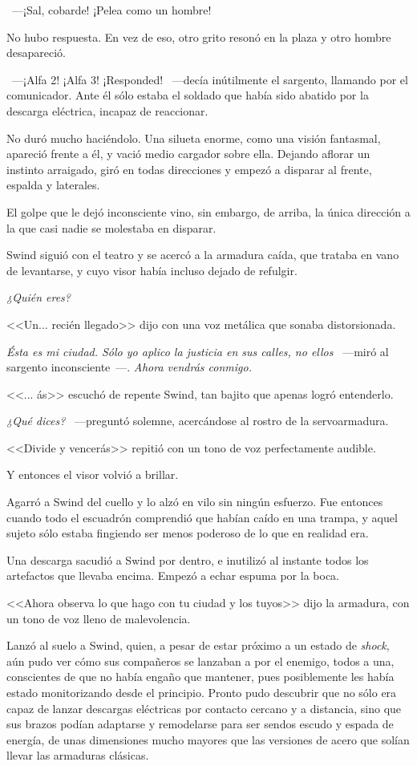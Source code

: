 ~---¡Sal, cobarde! ¡Pelea como un hombre!

No hubo respuesta. En vez de eso, otro grito resonó en la plaza y otro hombre desapareció.

~---¡Alfa 2! ¡Alfa 3! ¡Responded! ~---decía inútilmente el sargento, llamando por el comunicador. Ante él sólo estaba el soldado que había sido abatido por la descarga eléctrica, incapaz de reaccionar.

No duró mucho haciéndolo. Una silueta enorme, como una visión fantasmal, apareció frente a él, y vació medio cargador sobre ella. Dejando aflorar un instinto arraigado, giró en todas direcciones y empezó a disparar al frente, espalda y laterales.

El golpe que le dejó inconsciente vino, sin embargo, de arriba, la única dirección a la que casi nadie se molestaba en disparar.

Swind siguió con el teatro y se acercó a la armadura caída, que trataba en vano de levantarse, y cuyo visor había incluso dejado de refulgir.

\emph{¿Quién eres?}

<<Un... recién llegado>> dijo con una voz metálica que sonaba distorsionada.

\emph{Ésta es mi ciudad. Sólo yo aplico la justicia en sus calles, no ellos} ~---miró al sargento inconsciente~---. \emph{Ahora vendrás conmigo.}

<<... ás>> escuchó de repente Swind, tan bajito que apenas logró entenderlo.

\emph{¿Qué dices?} ~---preguntó solemne, acercándose al rostro de la servoarmadura.

<<Divide y vencerás>> repitió con un tono de voz perfectamente audible.

Y entonces el visor volvió a brillar.

Agarró a Swind del cuello y lo alzó en vilo sin ningún esfuerzo. Fue entonces cuando todo el escuadrón comprendió que habían caído en una trampa, y aquel sujeto sólo estaba fingiendo ser menos poderoso de lo que en realidad era.

Una descarga sacudió a Swind por dentro, e inutilizó al instante todos los artefactos que llevaba encima. Empezó a echar espuma por la boca.

<<Ahora observa lo que hago con tu ciudad y los tuyos>> dijo la armadura, con un tono de voz lleno de malevolencia.

Lanzó al suelo a Swind, quien, a pesar de estar próximo a un estado de \emph{shock}, aún pudo ver cómo sus compañeros se lanzaban a por el enemigo, todos a una, conscientes de que no había engaño que mantener, pues posiblemente les había estado monitorizando desde el principio. Pronto pudo descubrir que no sólo era capaz de lanzar descargas eléctricas por contacto cercano y a distancia, sino que sus brazos podían adaptarse y remodelarse para ser sendos escudo y espada de energía, de unas dimensiones mucho mayores que las versiones de acero que solían llevar las armaduras clásicas.

